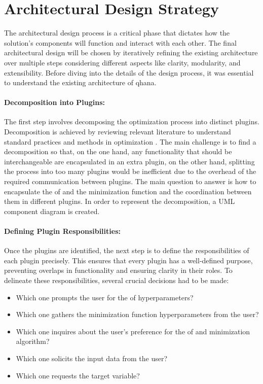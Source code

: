 \documentclass[
  a4paper,  %
  twoside,  %
  bibliography=totoc,
  headsepline,
  cleardoublepage=empty,
  parskip=half,
  draft=false
]{scrbook}
\begin{document}
\section{Architectural Design Strategy}
\label{sec:architecturalDesignStrategy}

The architectural design process is a critical phase that dictates how the solution's components will function and interact with each other.
The final architectural design will be chosen by iteratively refining the existing architecture over multiple steps considering different aspects like clarity, modularity, and extensibility.
Before diving into the details of the design process, it was essential to understand the existing architecture of \gls{qhana}.

\paragraph{Decomposition into Plugins:}
The first step involves decomposing the optimization process into distinct plugins.
Decomposition is achieved by reviewing relevant literature to understand standard practices and methods in optimization \cite{Virtanen2020, Nocedal2006, ShalevShwartz2014, Weinan2017}.
The main challenge is to find a decomposition so that, on the one hand, any functionality that should be interchangeable are encapsulated in an extra plugin,
on the other hand, splitting the process into too many plugins would be inefficient due to the overhead of the required communication between plugins.
The main question to answer is how to encapsulate the \gls{of} and the minimization function and the coordination between them in different plugins.
In order to represent the decomposition, a UML component diagram is created.

\paragraph{Defining Plugin Responsibilities:}
Once the plugins are identified, the next step is to define the responsibilities of each plugin precisely.
This ensures that every plugin has a well-defined purpose, preventing overlaps in functionality and ensuring clarity in their roles.
To delineate these responsibilities, several crucial decisions had to be made:

\begin{itemize}
  \item Which one prompts the user for the \gls{of} hyperparameters?
  \item Which one gathers the minimization function hyperparameters from the user?
  \item Which one inquires about the user's preference for the \gls{of} and minimization algorithm?
  \item Which one solicits the input data from the user?
  \item Which one requests the target variable?
\end{itemize}
\end{document}

